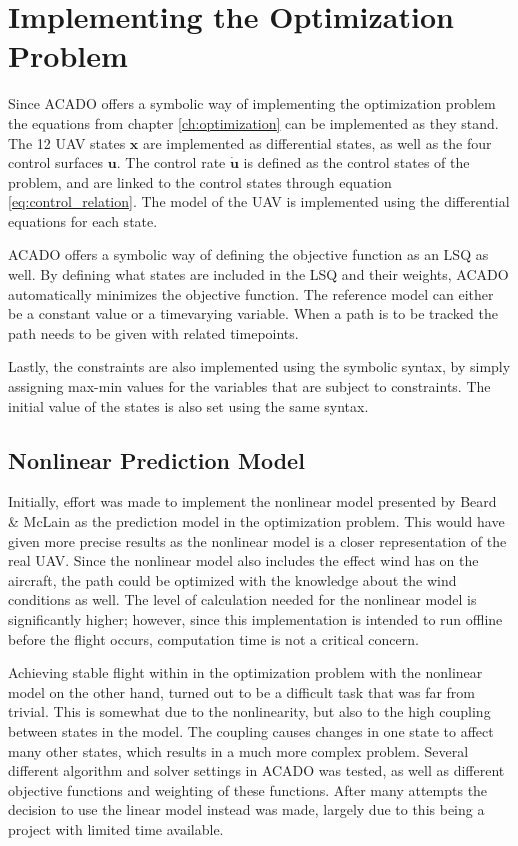 \section{Implementing the Optimization Problem}

Since ACADO offers a symbolic way of implementing the optimization problem the equations from chapter \ref{ch:optimization} can be implemented as they stand. The 12 UAV states $\mathbf{x}$ are implemented as differential states, as well as the four control surfaces $\mathbf{u}$. The control rate $\mathbf{\dot{u}}$ is defined as the control states of the problem, and are linked to the control states through equation \ref{eq:control_relation}. The model of the UAV is implemented using the differential equations for each state.

ACADO offers a symbolic way of defining the objective function as an LSQ as well. By defining what states are included in the LSQ and their weights, ACADO automatically minimizes the objective function. The reference model can either be a constant value or a timevarying variable. When a path is to be tracked the path needs to be given with related timepoints.

Lastly, the constraints are also implemented using the symbolic syntax, by simply assigning max-min values for the variables that are subject to constraints. The initial value of the states is also set using the same syntax. 


\subsection{Nonlinear Prediction Model}

Initially, effort was made to implement the nonlinear model presented by Beard \& McLain \cite{uavBEARD} as the prediction model in the optimization problem. This would have given more precise results as the nonlinear model is a closer representation of the real UAV. Since the nonlinear model also includes the effect wind has on the aircraft, the path could be optimized with the knowledge about the wind conditions as well. The level of calculation needed for the nonlinear model is significantly higher; however, since this implementation is intended to run offline before the flight occurs, computation time is not a critical concern.

Achieving stable flight within in the optimization problem with the nonlinear model on the other hand, turned out to be a difficult task that was far from trivial. This is somewhat due to the nonlinearity, but also to the high coupling between states in the model. The coupling causes changes in one state to affect many other states, which results in a much more complex problem. Several different algorithm and solver settings in ACADO was tested, as well as different objective functions and weighting of these functions. After many attempts the decision to use the linear model instead was made, largely due to this being a project with limited time available.


